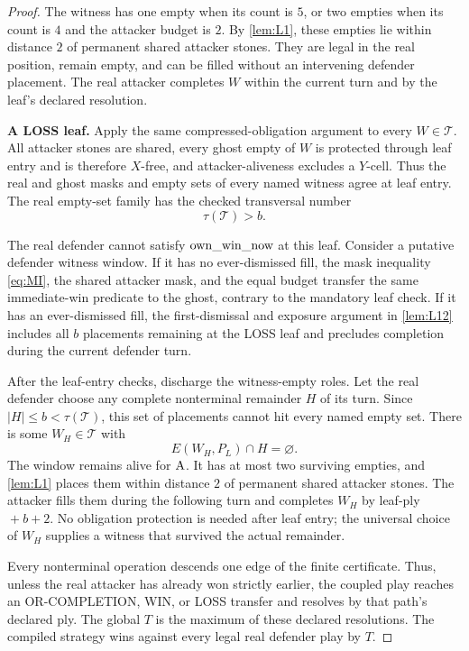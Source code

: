 \begin{proof}
The witness has one empty when its count is $5$, or two empties when its count
is $4$ and the attacker budget is $2$.  By \cref{lem:L1}, these empties lie
within distance $2$ of permanent shared attacker stones.  They are legal in
the real position, remain empty, and can be filled without an intervening
defender placement.  The real attacker completes $W$ within the current turn
and by the leaf's declared resolution.

\medskip\noindent
\textbf{A LOSS leaf.}
Apply the same compressed-obligation argument to every $W\in\mathcal T$.
All attacker stones are shared, every ghost empty of $W$ is protected through
leaf entry and is therefore $X$-free, and attacker-aliveness excludes a
$Y$-cell.  Thus the real and ghost masks and empty sets of every named witness
agree at leaf entry.  The real empty-set family has the checked transversal
number
\[
  \tau(\mathcal T)>b.
\]

The real defender cannot satisfy $\operatorname{own\_win\_now}$ at this leaf.  Consider a
putative defender witness window.  If it has no ever-dismissed fill, the mask
inequality \eqref{eq:MI}, the shared attacker mask, and the equal budget
transfer the same immediate-win predicate to the ghost, contrary to the
mandatory leaf check.  If it has an ever-dismissed fill, the first-dismissal
and exposure argument in \cref{lem:L12} includes all $b$ placements remaining
at the LOSS leaf and precludes completion during the current defender turn.

After the leaf-entry checks, discharge the witness-empty roles.  Let the real
defender choose any complete nonterminal remainder $H$ of its turn.  Since
$|H|\le b<\tau(\mathcal T)$, this set of placements cannot hit every named
empty set.  There is some $W_H\in\mathcal T$ with
\[
  E(W_H,P_L)\cap H=\varnothing.
\]
The window remains alive for $\mathrm{A}$.  It has at most two surviving empties, and
\cref{lem:L1} places them within distance $2$ of permanent shared attacker
stones.  The attacker fills them during the following turn and completes
$W_H$ by leaf-ply${}+b+2$.  No obligation protection is needed after leaf
entry; the universal choice of $W_H$ supplies a witness that survived the
actual remainder.

Every nonterminal operation descends one edge of the finite certificate.
Thus, unless the real attacker has already won strictly earlier, the coupled
play reaches an OR-COMPLETION, WIN, or LOSS transfer and resolves by that
path's declared ply.  The global $T$ is the maximum of these declared
resolutions.  The compiled strategy wins against every legal real defender
play by $T$.
\end{proof}
